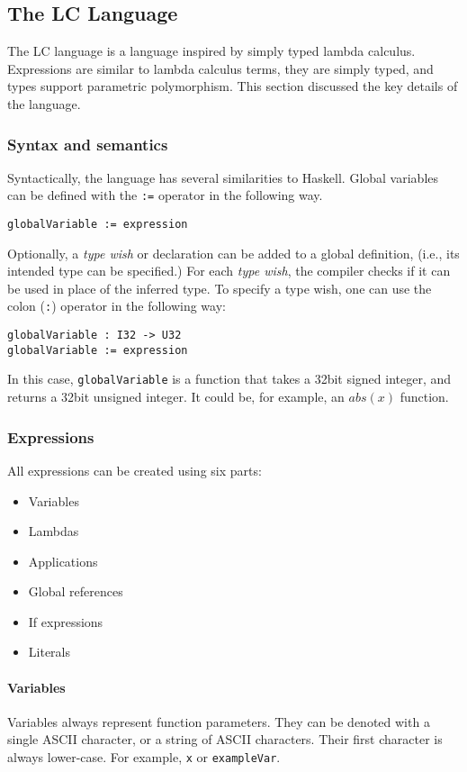 \documentclass[12pt]{article}
\begin{document}
\subsection{The LC Language}

The LC language is a language inspired by simply typed lambda calculus.
Expressions are similar to lambda calculus terms, they are simply typed, and
types support parametric polymorphism. This section discussed the key details of
the language.

\subsubsection{Syntax and semantics}

Syntactically, the language has several similarities to Haskell. Global
variables can be defined with the \texttt{:=} operator in the following way.
\begin{lstlisting}
globalVariable := expression
\end{lstlisting}
Optionally, a \emph{type wish} or declaration can be added to a global
definition, (i.e., its intended type can be specified.) For each \emph{type
wish}, the compiler checks if it can be used in place of the inferred type. To
specify a type wish, one can use the colon (\verb$:$) operator in the following
way:
\begin{lstlisting}
globalVariable : I32 -> U32
globalVariable := expression
\end{lstlisting}
In this case, \verb$globalVariable$ is a function that takes a 32bit signed
integer, and returns a 32bit unsigned integer. It could be, for example, an
$abs(x)$ function.

\subsubsection{Expressions}

All expressions can be created using six parts:
\begin{itemize}
    \item Variables
    \item Lambdas
    \item Applications
    \item Global references
    \item If expressions
    \item Literals
\end{itemize}

\paragraph{Variables} Variables always represent function parameters. They can
be denoted with a single ASCII character, or a string of ASCII characters. Their
first character is always lower-case. For example, \verb$x$ or
\verb$exampleVar$.
\end{document}
